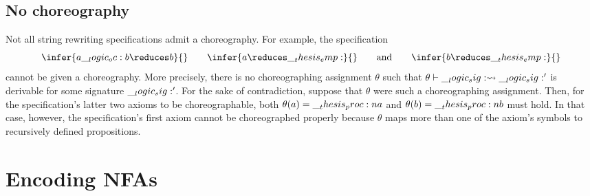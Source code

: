 


\subsection{No choreography}

Not all string rewriting specifications admit a choreography.
For example, the specification
\begin{equation*}
  \infer{a \oc b \reduces b}{}
  \qquad
  \infer{a \reduces \emp}{}
  \qquad\text{and}\qquad
  \infer{b \reduces \emp}{}
\end{equation*}
cannot be given a choreography.
More precisely, there is no choreographing assignment $\theta$ such that $\theta \vdash \__logic_sig: \rightsquigarrow \__logic_sig:'$ is derivable for some signature $\__logic_sig:'$.
For the sake of contradiction, suppose that $\theta$ were such a choreographing assignment.
Then, for the specification's latter two axioms to be choreographable, both $\theta(a) = \__thesis_proc:n {a}$ and $\theta(b) = \__thesis_proc:n {b}$ must hold.
In that case, however, the specification's first axiom cannot be choreographed properly because $\theta$ maps more than one of the axiom's symbols to recursively defined propositions.


\section{Encoding \aclp*{NFA}}

